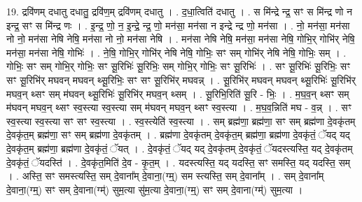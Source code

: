 \documentclass[17pt]{extarticle}
\begin{document}
19. द्रवि॑णम् दधातु दधातु॒ द्रवि॑ण॒म् द्रवि॑णम् दधातु । . द॒धा॒त्विति॑ दधातु । . स मि॑न्द्रे न्द्र॒ सꣳ स मि॑न्द्र णो न इन्द्र॒ सꣳ स मि॑न्द्र णः । . इ॒न्द्र॒ णो॒ न॒ इ॒न्द्रे॒ न्द्र॒ णो॒ मन॑सा॒ मन॑सा न इन्द्रे न्द्र णो॒ मन॑सा । . नो॒ मन॑सा॒ मन॑सा नो नो॒ मन॑सा नेषि नेषि॒ मन॑सा नो नो॒ मन॑सा नेषि । . मन॑सा नेषि नेषि॒ मन॑सा॒ मन॑सा नेषि॒ गोभि॒र् गोभि॑र् नेषि॒ मन॑सा॒ मन॑सा नेषि॒ गोभिः॑ । . ने॒षि॒ गोभि॒र् गोभि॑र् नेषि नेषि॒ गोभिः॒ सꣳ सम् गोभि॑र् नेषि नेषि॒ गोभिः॒ सम् । . गोभिः॒ सꣳ सम् गोभि॒र् गोभिः॒ सꣳ सू॒रिभिः॑ सू॒रिभिः॒ सम् गोभि॒र् गोभिः॒ सꣳ सू॒रिभिः॑ । . सꣳ सू॒रिभिः॑ सू॒रिभिः॒ सꣳ सꣳ सू॒रिभि॑र् मघवन् मघवन् थ्सू॒रिभिः॒ सꣳ सꣳ सू॒रिभि॑र् मघवन्न् । . सू॒रिभि॑र् मघवन् मघवन् थ्सू॒रिभिः॑ सू॒रिभि॑र् मघव॒न् थ्सꣳ सम् म॑घवन् थ्सू॒रिभिः॑ सू॒रिभि॑र् मघव॒न् थ्सम् । . सू॒रिभि॒रिति॑ सू॒रि - भिः॒ । . म॒घ॒व॒न् थ्सꣳ सम् म॑घवन् मघव॒न् थ्सꣳ स्व॒स्त्या स्व॒स्त्या सम् म॑घवन् मघव॒न् थ्सꣳ स्व॒स्त्या । . म॒घ॒व॒न्निति॑ मघ - व॒न्न् । . सꣳ स्व॒स्त्या स्व॒स्त्या सꣳ सꣳ स्व॒स्त्या । . स्व॒स्त्येति॑ स्व॒स्त्या । . सम् ब्रह्म॑णा॒ ब्रह्म॑णा॒ सꣳ सम् ब्रह्म॑णा दे॒वकृ॑तम् दे॒वकृ॑त॒म् ब्रह्म॑णा॒ सꣳ सम् ब्रह्म॑णा दे॒वकृ॑तम् । . ब्रह्म॑णा दे॒वकृ॑तम् दे॒वकृ॑त॒म् ब्रह्म॑णा॒ ब्रह्म॑णा दे॒वकृ॑तं॒ ॅयद् यद् दे॒वकृ॑त॒म् ब्रह्म॑णा॒ ब्रह्म॑णा दे॒वकृ॑तं॒ ॅयत् । . दे॒वकृ॑तं॒ ॅयद् यद् दे॒वकृ॑तम् दे॒वकृ॑तं॒ ॅयदस्त्यस्ति॒ यद् दे॒वकृ॑तम् दे॒वकृ॑तं॒ ॅयदस्ति॑ । . दे॒वकृ॑त॒मिति॑ दे॒व - कृ॒त॒म् । . यदस्त्यस्ति॒ यद् यदस्ति॒ सꣳ समस्ति॒ यद् यदस्ति॒ सम् । . अस्ति॒ सꣳ समस्त्यस्ति॒ सम् दे॒वाना᳚म् दे॒वाना॒(ग्म्॒) सम स्त्यस्ति॒ सम् दे॒वाना᳚म् । . सम् दे॒वाना᳚म् दे॒वाना॒(ग्म्॒) सꣳ सम् दे॒वाना(ग्म्॑) सुम॒त्या सु॑म॒त्या दे॒वाना॒(ग्म्॒) सꣳ सम् दे॒वाना(ग्म्॑) सुम॒त्या । \newline
\end{document}
